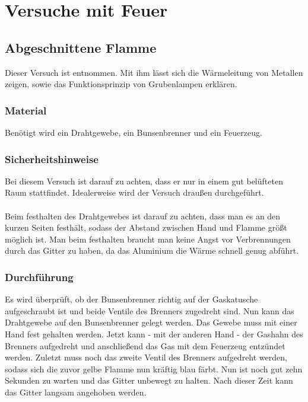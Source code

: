 \newpage
\chapter{Versuche mit Feuer}

\section{Abgeschnittene Flamme}

Dieser Versuch ist \cite{Physikanten} entnommen.
Mit ihm lässt sich die Wärmeleitung von Metallen zeigen, sowie das Funktionsprinzip von Grubenlampen erklären.

\subsection{Material}

Benötigt wird ein Drahtgewebe, ein Bunsenbrenner und ein Feuerzeug.

\subsection{Sicherheitshinweise}

Bei diesem Versuch ist darauf zu achten, dass er nur in einem gut belüfteten Raum stattfindet.
Idealerweise wird der Versuch draußen durchgeführt.\\
\\
Beim festhalten des Drahtgewebes ist darauf zu achten, dass man es an den kurzen Seiten festhält, sodass der Abstand zwischen Hand und Flamme größt möglich ist.
Man beim festhalten braucht man keine Angst vor Verbrennungen durch das Gitter zu haben, da das Aluminium die Wärme schnell genug abführt.

\subsection{Durchführung}

Es wird überprüft, ob der Bunsenbrenner richtig auf der Gaskatusche aufgeschraubt ist und beide Ventile des Brenners zugedreht sind.
Nun kann das Drahtgewebe auf den Bunsenbrenner gelegt werden.
Das Gewebe muss mit einer Hand fest gehalten werden.
Jetzt kann - mit der anderen Hand - der Gashahn des Brenners aufgedreht und anschließend das Gas mit dem Feuerzeug entzündet werden.
Zuletzt muss noch das zweite Ventil des Brenners aufgedreht werden, sodass sich die zuvor gelbe Flamme nun kräftig blau färbt.
Nun ist noch gut zehn Sekunden zu warten und das Gitter unbewegt zu halten.
Nach dieser Zeit kann das Gitter langsam angehoben werden.

